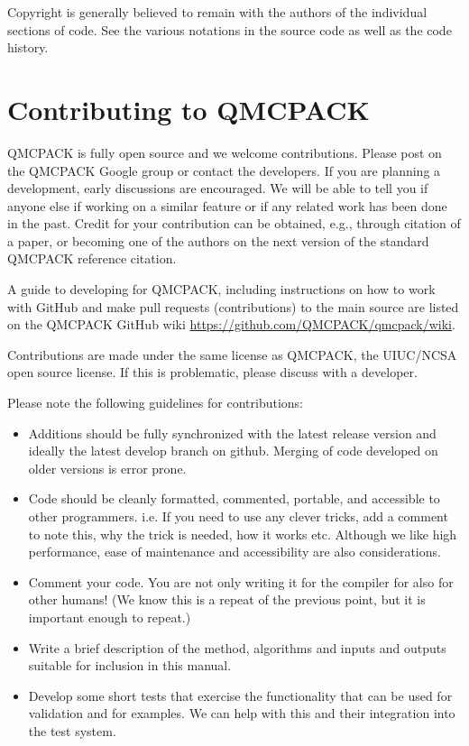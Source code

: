 Copyright is generally believed to remain with the authors of the
individual sections of code. See the various notations in the source code as
well as the code history.

\section{Contributing to QMCPACK}
\label{sec:contributing}

QMCPACK is fully open source and we welcome contributions.  Please
post on the QMCPACK Google group or contact the developers. If you are
planning a development, early discussions are encouraged. We will be
able to tell you if anyone else if working on a similar feature or if
any related work has been done in the past.  Credit for your
contribution can be obtained, e.g., through citation of a paper, or
becoming one of the authors on the next version of the standard
QMCPACK reference citation.

A guide to developing for QMCPACK, including instructions on how to
work with GitHub and make pull requests (contributions) to the main
source are listed on the QMCPACK GitHub wiki
\url{https://github.com/QMCPACK/qmcpack/wiki}.

Contributions are made under the same license as QMCPACK, the
UIUC/NCSA open source license. If this is problematic, please discuss
with a developer.

Please note the following guidelines for contributions:
\begin{itemize}
\item Additions should be fully synchronized with the latest release
  version and ideally the latest develop branch on github. Merging of code
  developed on older versions is error prone.
\item Code should be cleanly formatted, commented, portable, and accessible to
  other programmers. i.e. If you need to use any clever tricks, add a comment
  to note this, why the trick is needed, how it works etc. Although we like
  high performance, ease of maintenance and accessibility are also
  considerations.
\item Comment your code. You are not only writing it for the compiler
  for also for other humans! (We know this is a repeat of the previous
  point, but it is important enough to repeat.)
\item Write a brief description of the method, algorithms and inputs and outputs
  suitable for inclusion in this manual.
\item Develop some short tests that exercise the
  functionality that can be used for validation and for examples. We
  can help with this and their integration into the test system.
\end{itemize}

